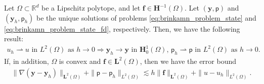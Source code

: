 \documentclass[final]{siamart0216}
\begin{document}
\begin{proposition}\label{theorem_convergence_01}
Let $\Omega \subset \mathbb{R}^d$ be a Lipschitz polytope, and let $\mathbf{f} \in \mathbf{H}^{-1}(\Omega)$. Let $(\mathbf{y},\mathsf{p})$ and $(\mathbf{y}_{h},\mathsf{p}_{h})$ be the unique solutions of problems \eqref{eq:brinkamn_problem_state} and \eqref{eq:brinkamn_problem_state_fd}, respectively. Then, we have the following result:
\begin{align}\label{eq:convergence_prop}
u_{h}\rightharpoonup u
\textrm{ in }
L^2(\Omega) 
\textrm{ as } h \rightarrow 0
\Rightarrow 
\mathbf{y}_{h} \to \mathbf{y}
\textrm{ in }
\mathbf{H}_0^1(\Omega),
\,
\mathsf{p}_h \rightharpoonup \mathsf{p}
\textrm{ in } L^2(\Omega) \textrm{ as } h \rightarrow 0.
\end{align}
If, in addition, $\Omega$ is convex and $\mathbf{f} \in \mathbf{L}^{2}(\Omega)$, then we have the error bound
\begin{align}\label{eq:errorbound}
\|\nabla(\mathbf{y}-\mathbf{y}_{h})\|_{\mathbf{L}^2(\Omega)}+\|\mathsf{p}-\mathsf{p}_{h}\|_{L^2(\Omega)}\lesssim h \|\mathbf{f}\|_{\mathbf{L}^2(\Omega)}+\|u-u_{h}\|_{L^2(\Omega)}.
\end{align}
\end{proposition}
\end{document}
